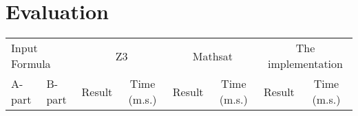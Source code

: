 \section{Evaluation}


\begin{tabular}{llcccccc} \toprule
  \multicolumn{2}{l}{Input Formula} & \multicolumn{2}{c}{Z3}& \multicolumn{2}{c}{Mathsat}& \multicolumn{2}{c}{The implementation} 
  \\\cmidrule(lr){1-2}\cmidrule(lr){3-4}\cmidrule(lr){5-6}\cmidrule(lr){7-8}
  A-part & B-part & Result & Time (m.s.) & Result & Time (m.s.) & Result & Time (m.s.) \\

  


\end{tabular}
